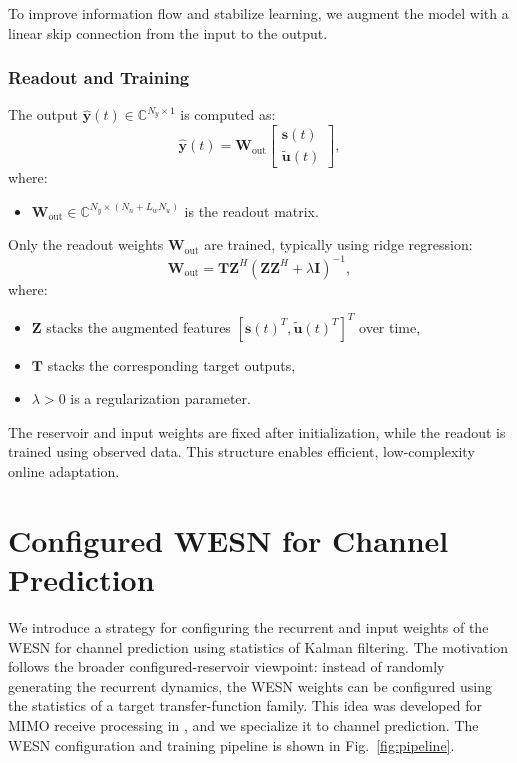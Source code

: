 \documentclass[lettersize,journal]{IEEEtran}
\begin{document}
To improve information flow and stabilize learning, we augment the model with a linear skip connection from the input to the output.

\subsubsection{Readout and Training}

The output $\hat{\mathbf{y}}(t) \in \mathbb{C}^{N_y \times 1}$ is computed as:
\begin{equation}
\hat{\mathbf{y}}(t)
=
\mathbf{W}_{\mathrm{out}}
\begin{bmatrix}
\mathbf{s}(t) \\
\tilde{\mathbf{u}}(t)
\end{bmatrix},
\end{equation}
where:
\begin{itemize}
    \item $\mathbf{W}_{\mathrm{out}} \in \mathbb{C}^{N_y \times (N_n + L_w N_u)}$ is the readout matrix.
\end{itemize}

Only the readout weights $\mathbf{W}_{\mathrm{out}}$ are trained, typically using ridge regression:
\begin{equation}
\mathbf{W}_{\mathrm{out}}
=
\mathbf{T} \mathbf{Z}^H \left( \mathbf{Z} \mathbf{Z}^H + \lambda \mathbf{I} \right)^{-1},
\end{equation}
where:
\begin{itemize}
    \item $\mathbf{Z}$ stacks the augmented features $[\mathbf{s}(t)^T, \tilde{\mathbf{u}}(t)^T]^T$ over time,
    \item $\mathbf{T}$ stacks the corresponding target outputs,
    \item $\lambda > 0$ is a regularization parameter.
\end{itemize}

The reservoir and input weights are fixed after initialization, while the readout is trained using observed data. This structure enables efficient, low-complexity online adaptation.

\section{Configured WESN for Channel Prediction}

We introduce a strategy for configuring the recurrent and input weights of the WESN for channel prediction using statistics of Kalman filtering. 
The motivation follows the broader configured-reservoir viewpoint: instead of randomly generating the recurrent dynamics, the WESN weights can be configured using the statistics of a target transfer-function family. 
This idea was developed for MIMO receive processing in \cite{shashank_xai}, and we specialize it to channel prediction.
The WESN configuration and training pipeline is shown in Fig.~\ref{fig:pipeline}.
\end{document}
